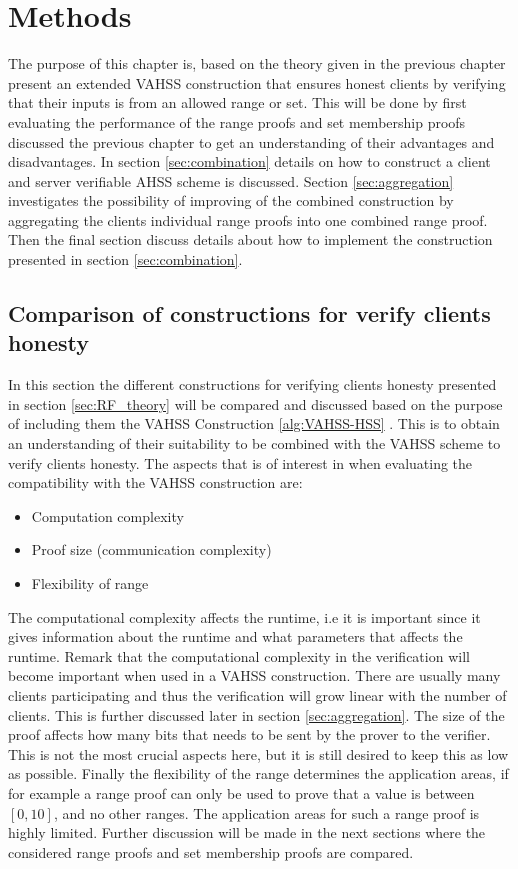 \chapter{Methods}
\label{ch:Methods}

The purpose of this chapter is, based on the theory given in the previous chapter present an extended VAHSS construction that ensures honest clients by verifying that their inputs is from an allowed range or set. This will be done by first evaluating the performance of the range proofs and set membership proofs discussed the previous chapter to get an understanding of their advantages and disadvantages. In section \ref{sec:combination} details on how to construct a  client and server verifiable AHSS scheme is discussed. Section \ref{sec:aggregation} investigates the possibility of  improving of the combined construction by aggregating the  clients individual range proofs into one combined range proof. Then the final section discuss details about how to implement the construction presented in section \ref{sec:combination}.

\section{Comparison of constructions for verify clients honesty}
In this section the different constructions for verifying clients honesty presented in section \ref{sec:RF_theory} will be compared and discussed based on the purpose of including them the VAHSS Construction \ref{alg:VAHSS-HSS} . This is to obtain an understanding of their suitability to be combined with the VAHSS scheme to verify clients honesty. The aspects that  is of interest in when evaluating the compatibility with the VAHSS construction are:
\begin{itemize}
    \item Computation complexity  
    \item Proof size (communication complexity)
    \item Flexibility of range
\end{itemize}
The computational complexity affects the runtime, i.e it is important since it gives information about the runtime and what parameters that affects the runtime. Remark that the computational complexity in the verification will become important when used in a VAHSS construction. There are usually many clients participating and thus the verification will grow linear with the number of clients. This is further discussed later in section \ref{sec:aggregation}. The size of the proof affects how many bits that needs to be sent by the prover to the verifier. This is not the most crucial aspects here, but it is still desired to keep this as low as possible. Finally the flexibility of the range determines the application areas, if for example a range proof can only be used to prove that a value is between $[0,10]$, and no other ranges. The application areas for such a range proof is highly limited. Further discussion will be made in the next sections where the considered range proofs and set membership proofs are compared.

